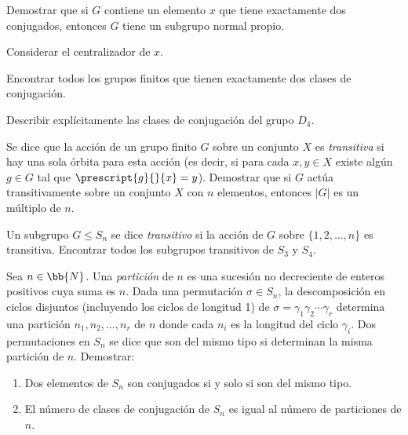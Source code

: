 \begin{ejercicio}\label{ej:6.4}
    Demostrar que si $G$ contiene un elemento $x$ que tiene exactamente dos conjugados, entonces $G$ tiene un subgrupo normal propio.
    \begin{observacion}
        Considerar el centralizador de $x$.
    \end{observacion}
\end{ejercicio}

\begin{ejercicio}\label{ej:6.5}
    Encontrar todos los grupos finitos que tienen exactamente dos clases de conjugación.
\end{ejercicio}

\begin{ejercicio}\label{ej:6.6}
    Describir explícitamente las clases de conjugación del grupo $D_4$.
\end{ejercicio}

\begin{ejercicio}\label{ej:6.7}
    Se dice que la acción de un grupo finito $G$ sobre un conjunto $X$ es \emph{transitiva} si hay una sola órbita para esta acción (es decir, si para cada $x, y \in X$ existe algún $g \in G$ tal que $\prescript{g}{}{x} = y$). Demostrar que si $G$ actúa transitivamente sobre un conjunto $X$ con $n$ elementos, entonces $|G|$ es un múltiplo de $n$.
\end{ejercicio}

\begin{ejercicio}\label{ej:6.8}
    Un subgrupo $G \leq S_n$ se dice \emph{transitivo} si la acción de $G$ sobre $\{1, 2, \ldots, n\}$ es transitiva. Encontrar todos los subgrupos transitivos de $S_3$ y $S_4$.
\end{ejercicio}

\begin{ejercicio}\label{ej:6.9}
    Sea $n\in \bb{N}$. Una \emph{partición} de $n$ es una sucesión no decreciente de enteros positivos cuya suma es $n$. Dada una permutación $\sigma \in S_n$, la descomposición en ciclos disjuntos (incluyendo los ciclos de longitud 1) de $\sigma = \gamma_1 \gamma_2 \cdots \gamma_r$ determina una partición $n_1, n_2, \ldots, n_r$ de $n$ donde cada $n_i$ es la longitud del ciclo $\gamma_i$. Dos permutaciones en $S_n$ se dice que son del mismo tipo si determinan la misma partición de $n$. Demostrar:
    \begin{enumerate}
        \item Dos elementos de $S_n$ son conjugados si y solo si son del mismo tipo.
        \item El número de clases de conjugación de $S_n$ es igual al número de particiones de $n$.
    \end{enumerate}
\end{ejercicio}

